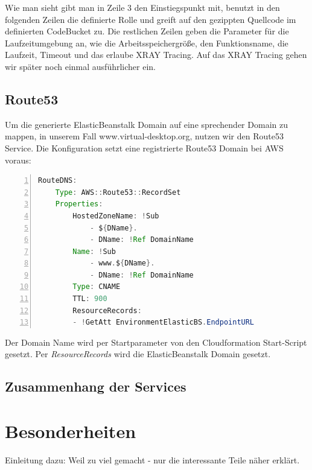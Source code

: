 \documentclass[a4paper, 12pt]{scrreprt}
\renewcommand\_{\textunderscore\allowbreak}
\begin{document}
Wie man sieht gibt man in Zeile 3 den Einstiegspunkt mit, benutzt in den folgenden Zeilen die definierte Rolle und greift auf den gezippten Quellcode im definierten CodeBucket zu. Die restlichen Zeilen geben die Parameter für die Laufzeitumgebung an, wie die Arbeitsspeichergröße, den Funktionsname, die Laufzeit, Timeout und das erlaube XRAY Tracing. Auf das XRAY Tracing gehen wir später noch einmal ausführlicher ein.

\section{Route53}
Um die generierte ElasticBeanstalk Domain auf eine sprechender Domain zu mappen, in unserem Fall www.virtual-desktop.org, nutzen wir den Route53 Service. Die Konfiguration setzt eine registrierte Route53 Domain bei AWS voraus:

\begin{lstlisting}[xleftmargin=\parindent,numbers=left,numberstyle=\small,numbersep=8pt,frame=L,mathescape=true, basicstyle=\small, language=Java, lineskip={1.0pt}]
RouteDNS:
    Type: AWS::Route53::RecordSet
    Properties:
        HostedZoneName: !Sub
            - ${DName}.
            - DName: !Ref DomainName
        Name: !Sub
            - www.${DName}.
            - DName: !Ref DomainName
        Type: CNAME
        TTL: 900
        ResourceRecords:
        - !GetAtt EnvironmentElasticBS.EndpointURL
\end{lstlisting}

Der Domain Name wird per Startparameter von den Cloudformation Start-Script gesetzt. Per \textit{ResourceRecords} wird die ElasticBeanstalk Domain gesetzt.
 
\section{Zusammenhang der Services}
%













\chapter{Besonderheiten}
Einleitung dazu: Weil zu viel gemacht - nur die interessante Teile näher erklärt.
\end{document}

